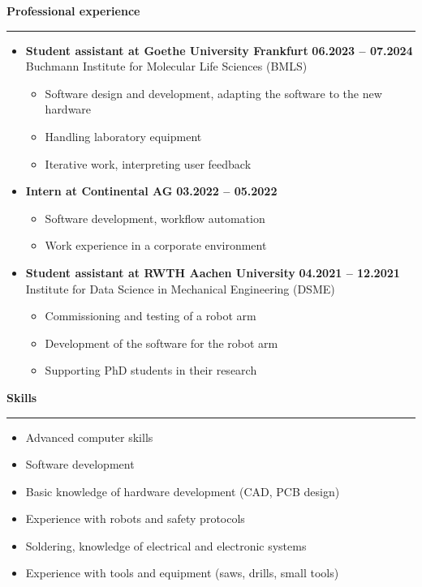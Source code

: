 \documentclass[12pt]{article} %
\newcommand{\HighlightedText}[1] {{\textbf{#1}}}
\newcommand{\PlaceAndTime}[2] {\HighlightedText{#1} \hfill \HighlightedText{#2}}
\newenvironment{ItemizeSection}[1]{
    \vspace{1mm}
    \HighlightedText{#1}
    \vspace{0.5mm}
    {\color{custom_blue} \hrule}
    \begin{itemize}[left=0.5em, topsep=0pt, itemsep=0pt, label={$\bullet$}]
}{
    \end{itemize}
}
\newenvironment{ItemizeSubsection}{
    \begin{itemize}[left=0.5em, topsep=-999pt, itemsep=0pt, label={$\circ$}]
}{
    \end{itemize}
}
\begin{document}
\begin{ItemizeSection}{Professional experience}
    \item \PlaceAndTime{Student assistant at Goethe University Frankfurt}{06.2023 -- 07.2024} \\
    Buchmann Institute for Molecular Life Sciences (BMLS)
    \begin{ItemizeSubsection}
        \item Software design and development, adapting the software to the new hardware
        \item Handling laboratory equipment
        \item Iterative work, interpreting user feedback
    \end{ItemizeSubsection}

    \item \PlaceAndTime{Intern at Continental AG}{03.2022 -- 05.2022}
    \begin{ItemizeSubsection}
        \item Software development, workflow automation
        \item Work experience in a corporate environment
    \end{ItemizeSubsection}

    \item \PlaceAndTime{Student assistant at RWTH Aachen University}{04.2021 -- 12.2021} \\
    Institute for Data Science in Mechanical Engineering (DSME)
    \begin{ItemizeSubsection}
        \item Commissioning and testing of a robot arm
        \item Development of the software for the robot arm
        \item Supporting PhD students in their research
    \end{ItemizeSubsection}
\end{ItemizeSection}

\newpage
\begin{ItemizeSection}{Skills}
    \item Advanced computer skills
    \item Software development
    \item Basic knowledge of hardware development (CAD, PCB design)
    \item Experience with robots and safety protocols
    \item Soldering, knowledge of electrical and electronic systems
    \item Experience with tools and equipment (saws, drills, small tools)
\end{ItemizeSection}
\end{document}
